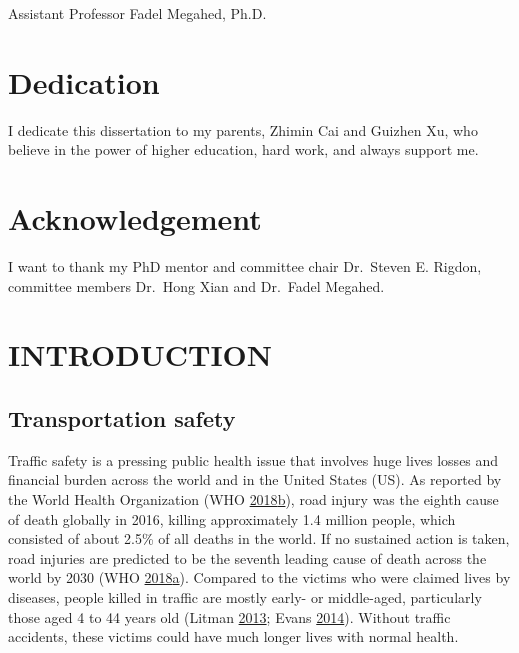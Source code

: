 \documentclass[12pt]{book}
\numberwithin{equation}{chapter}
\begin{document}
\vspace{.3cm}
Assistant Professor Fadel Megahed, Ph.D.
\vspace*{\fill}








\hypertarget{dedication}{%
\chapter*{Dedication}\label{dedication}}

I dedicate this dissertation to my parents, Zhimin Cai and Guizhen Xu, who believe in the power of higher education, hard work, and always support me.

\hypertarget{acknowledgement}{%
\chapter*{Acknowledgement}\label{acknowledgement}}

I want to thank my PhD mentor and committee chair Dr.~Steven E. Rigdon, committee members Dr.~Hong Xian and Dr.~Fadel Megahed.

\cleardoublepage
\tableofcontents

\listoffigures
\listoftables

\mainmatter
\doublespacing

\hypertarget{introduction}{%
\chapter{INTRODUCTION}\label{introduction}}

\hypertarget{transportation-safety}{%
\section{Transportation safety}\label{transportation-safety}}

Traffic safety is a pressing public health issue that involves huge lives losses and financial burden across the world and in the United States (US).
As reported by the World Health Organization (WHO \protect\hyperlink{ref-who2018}{2018}\protect\hyperlink{ref-who2018}{b}), road injury was the eighth cause of death globally in 2016, killing approximately 1.4 million people, which consisted of about 2.5\% of all deaths in the world.
If no sustained action is taken, road injuries are predicted to be the seventh leading cause of death across the world by 2030 (WHO \protect\hyperlink{ref-who2018b}{2018}\protect\hyperlink{ref-who2018b}{a}).
Compared to the victims who were claimed lives by diseases, people killed in traffic are mostly early- or middle-aged, particularly those aged 4 to 44 years old (Litman \protect\hyperlink{ref-litman2013transportation}{2013}; Evans \protect\hyperlink{ref-evans2014traffic}{2014}).
Without traffic accidents, these victims could have much longer lives with normal health.
\end{document}
